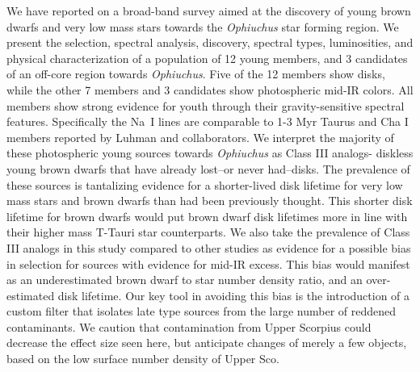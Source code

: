We have reported on a broad-band survey aimed at the discovery of young brown dwarfs and very low mass stars towards the \emph{Ophiuchus} star forming region.  We present the selection, spectral analysis, discovery, spectral types, luminosities, and physical characterization of a population of 12 young members, and 3 candidates of an off-core region towards \emph{Ophiuchus}.  Five of the 12 members show disks, while the other 7 members and 3 candidates show photospheric mid-IR colors.  All members show strong evidence for youth through their gravity-sensitive spectral features.  Specifically the Na~I lines are comparable to 1-3 Myr Taurus and Cha I members reported by Luhman and collaborators.  We interpret the majority of these photospheric young sources towards \emph{Ophiuchus} as Class III analogs- diskless young brown dwarfs that have already lost--or never had--disks.  The prevalence of these sources is tantalizing evidence for a shorter-lived disk lifetime for very low mass stars and brown dwarfs than had been previously thought.  This shorter disk lifetime for brown dwarfs would put brown dwarf disk lifetimes more in line with their higher mass T-Tauri star counterparts.  We also take the prevalence of Class III analogs in this study compared to other studies as evidence for a possible bias in selection for sources with evidence for mid-IR excess.  This bias would manifest as an underestimated brown dwarf to star number density ratio, and an over-estimated disk lifetime.  Our key tool in avoiding this bias is the introduction of a custom filter that isolates late type sources from the large number of reddened contaminants.  We caution that contamination from Upper Scorpius could decrease the effect size seen here, but anticipate changes of merely a few objects, based on the low surface number density of Upper Sco.
